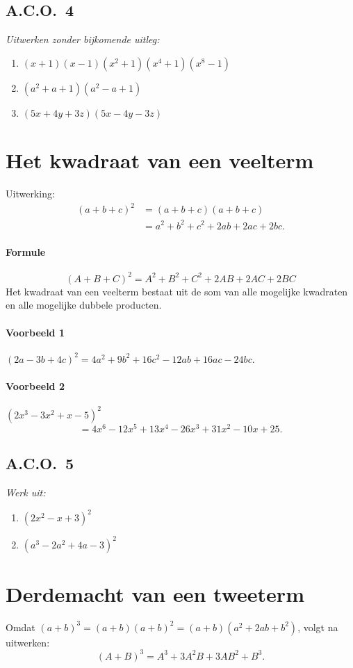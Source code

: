 \documentclass[a4paper,12pt]{article}
\begin{document}
\subsection*{A.C.O.\ 4}
\emph{Uitwerken zonder bijkomende uitleg:}
\begin{enumerate}
  \item \((x+1)(x-1)(x^2+1)(x^4+1)(x^8-1)\)
  \item \((a^2+a+1)(a^2-a+1)\)
  \item \((5x+4y+3z)(5x-4y-3z)\)
\end{enumerate}

\section{Het kwadraat van een veelterm}
Uitwerking:
\[
\begin{aligned}
(a+b+c)^2&=(a+b+c)(a+b+c)\\
&=a^2+b^2+c^2+2ab+2ac+2bc.
\end{aligned}
\]

\paragraph*{Formule}
\[
\boxed{(A+B+C)^2=A^2+B^2+C^2+2AB+2AC+2BC}
\]
Het kwadraat van een veelterm bestaat uit de som van alle mogelijke kwadraten en alle mogelijke dubbele producten.

\paragraph*{Voorbeeld 1}
\((2a-3b+4c)^2=4a^2+9b^2+16c^2-12ab+16ac-24bc\).

\paragraph*{Voorbeeld 2}
\((2x^3-3x^2+x-5)^2\)
\[
=4x^6-12x^5+13x^4-26x^3+31x^2-10x+25.
\]

\subsection*{A.C.O.\ 5}
\emph{Werk uit:}
\begin{enumerate}
  \item \((2x^2-x+3)^2\)
  \item \((a^3-2a^2+4a-3)^2\)
\end{enumerate}

\section{Derdemacht van een tweeterm}
Omdat \( (a+b)^3=(a+b)(a+b)^2=(a+b)(a^2+2ab+b^2)\), volgt na uitwerken:
\[
\boxed{(A+B)^3=A^3+3A^2B+3AB^2+B^3}.
\]
\end{document}
